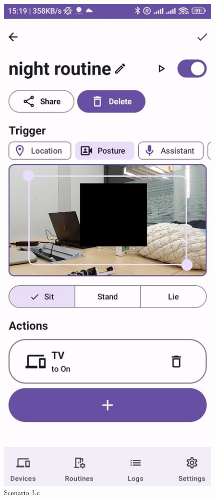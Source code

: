 \begin{enumerate}
\begin{enumerate}
\begin{figure}
        \includegraphics[width=0.5\linewidth]{imgs//usercase/scenario3-c.jpg}
        \caption{Scenario 3.c}
        \label{fig:enter-label}
    \end{figure}
    \end{enumerate}


\end{enumerate}

